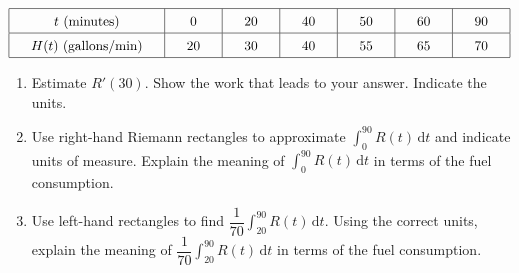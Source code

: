  \begin{align*}
    \arraycolsep=16.5pt\def\arraystretch{1.5}
    \begin{array}{|c|c|c|c|c|c|c|}
        \hline
        t \text{ (minutes)} & 0 & 20 & 40 & 50 & 60 & 90 \\ \hline
        H(t) \text{ (gallons/min)} & 20 & 30 & 40 & 55 & 65 & 70 \\
        \hline
    \end{array} 
\end{align*}
\begin{enumerate}[label=\hspace{11pt}(\alph*), align=left, leftmargin=*, labelsep=0.25em]
    \item Estimate $R'(30)$. Show the work that leads to your answer. Indicate the units.
    \item Use right-hand Riemann rectangles to approximate $\int_0^{90} R(t) \,\mathrm{d}t$ and indicate units of measure. Explain the meaning of $\int_0^{90} R(t) \,\mathrm{d}t$ in terms of the fuel consumption. 
    \item Use left-hand rectangles to find $\dfrac{1}{70}\int_{20}^{90} R(t) \,\mathrm{d}t$. Using the correct units, explain the meaning of $\dfrac{1}{70}\int_{20}^{90} R(t) \,\mathrm{d}t$ in terms of the fuel consumption.
\end{enumerate} \vspace{11pt}

